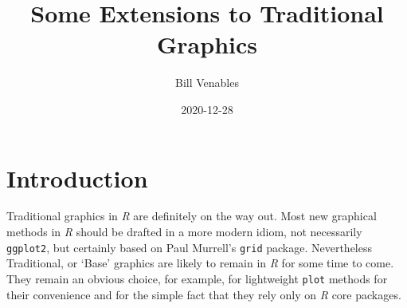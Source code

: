 \documentclass[
]{article}
\title{Some Extensions to Traditional Graphics}
\author{Bill Venables}
\date{2020-12-28}
\begin{document}
\maketitle

{
\setcounter{tocdepth}{3}
\tableofcontents
}
\hypertarget{introduction}{%
\section{Introduction}\label{introduction}}

Traditional graphics in \emph{\emph{R}} are definitely on the way out.
Most new graphical methods in \emph{\emph{R}} should be drafted in a
more modern idiom, not necessarily \texttt{ggplot2}, but certainly based
on Paul Murrell's \texttt{grid} package. Nevertheless Traditional, or
`Base' graphics are likely to remain in \emph{\emph{R}} for some time to
come. They remain an obvious choice, for example, for lightweight
\texttt{plot} methods for their convenience and for the simple fact that
they rely only on \emph{\emph{R}} core packages.
\end{document}
